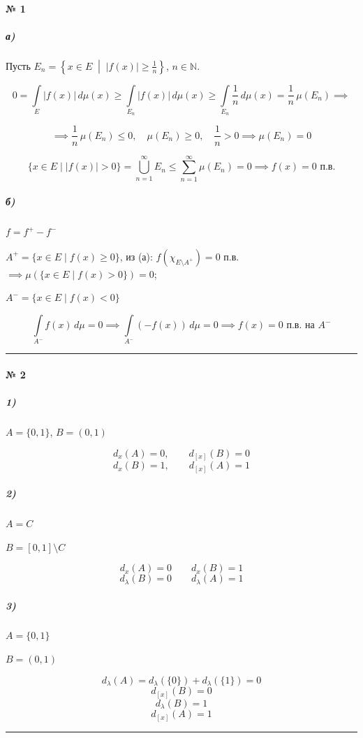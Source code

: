 \documentclass[11pt, a4paper]{article}
\begin{document}
\paragraph{№ 1}

\subparagraph{а)} 
Пусть $E_n = \left\{ x \in E \;\middle|\; |f(x)| \geqslant \frac{1}{n} \right\}$, $n \in \mathbb{N}$.

$$
0 = \int\limits_{E} |f(x)|\,d\mu(x) \geqslant \int\limits_{E_n} |f(x)|\,d\mu(x) \geqslant \int\limits_{E_n} \frac{1}{n}\,d\mu(x) = \frac{1}{n}\,\mu(E_n) \implies
$$

$$
\implies \frac{1}{n}\,\mu(E_n) \leqslant 0, \quad \mu(E_n) \geqslant 0, \quad \frac{1}{n} > 0 \implies \mu(E_n) = 0
$$

$$
\{ x \in E \mid |f(x)| > 0 \} = \bigcup_{n=1}^{\infty} E_n \leqslant \sum_{n=1}^{\infty} \mu(E_n) = 0 \implies f(x) = 0 \text{ п.в.}
$$

\subparagraph{б)}
$f = f^+ - f^-$

$A^+ = \{ x \in E \mid f(x) \geqslant 0 \}$, из (а): $f(\chi_{E \setminus A^+}) = 0$ п.в. $\implies \mu(\{x \in E \mid f(x) > 0\}) = 0$;

$A^- = \{ x \in E \mid f(x) < 0 \}$

$$
\int\limits_{A^-} f(x)\,d\mu = 0 \implies \int\limits_{A^-} (-f(x))\,d\mu = 0 \implies f(x) = 0 \text{ п.в. на } A^-
$$

\vspace{1.5em}
\hrule
\vspace{1.5em}

\paragraph{№ 2}

\subparagraph{1)}
$A = \{0, 1\}$, \quad $B = (0, 1)$

$$
d_x(A) = 0, \qquad d_{[x]}(B) = 0
$$
$$
d_x(B) = 1, \qquad d_{[x]}(A) = 1
$$

\subparagraph{2)}
$A = C$

$B = [0, 1] \setminus C$

$$
d_x(A) = 0 \qquad d_x(B) = 1
$$
$$
d_\lambda(B) = 0 \qquad d_\lambda(A) = 1
$$

\subparagraph{3)}
$A = \{0, 1\}$

$B = (0, 1)$

$$
d_\lambda(A) = d_\lambda(\{0\}) + d_\lambda(\{1\}) = 0
$$
$$
d_{[x]}(B) = 0
$$
$$
d_\lambda(B) = 1
$$
$$
d_{[x]}(A) = 1
$$

\vspace{1.5em}
\hrule
\vspace{1.5em}
\end{document}
